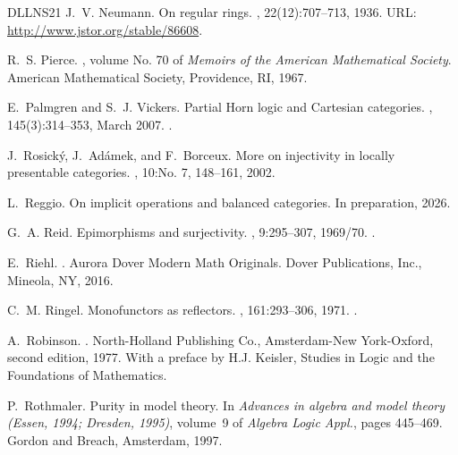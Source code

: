 \documentclass[a4paper,10pt,reqno]{amsart}
\theoremstyle{definition}
\theoremstyle{remark}
\begin{document}
\begin{thebibliography}{DLLNS21}
  J.~V. Neumann.
  \newblock On regular rings.
  , 22(12):707--713, 1936.
  \newblock URL: \url{http://www.jstor.org/stable/86608}.
  
  R.~S. Pierce.
  , volume No. 70 of {\em Memoirs of the American Mathematical Society}.
  \newblock American Mathematical Society, Providence, RI, 1967.
  
  E.~Palmgren and S.~J. Vickers.
  \newblock Partial {Horn} logic and {Cartesian} categories.
  , 145(3):314--353, March 2007.
  \newblock \href {https://doi.org/10.1016/j.apal.2006.10.001} {}.
  
  J.~Rosick\'y, J.~Ad\'amek, and F.~Borceux.
  \newblock More on injectivity in locally presentable categories.
  , 10:No. 7, 148--161, 2002.
  
  L.~Reggio.
  \newblock On implicit operations and balanced categories.
  \newblock In preparation, 2026.
  
  G.~A. Reid.
  \newblock Epimorphisms and surjectivity.
  , 9:295--307, 1969/70.
  \newblock \href {https://doi.org/10.1007/BF01425484} {}.
  
  E.~Riehl.
  .
  \newblock Aurora Dover Modern Math Originals. Dover Publications, Inc., Mineola, NY, 2016.
  
  C.~M. Ringel.
  \newblock Monofunctors as reflectors.
  , 161:293--306, 1971.
  \newblock \href {https://doi.org/10.2307/1995944} {}.
  
  A.~Robinson.
  .
  \newblock North-Holland Publishing Co., Amsterdam-New York-Oxford, second edition, 1977.
  \newblock With a preface by H.J. Keisler, Studies in Logic and the Foundations of Mathematics.
  
  P.~Rothmaler.
  \newblock Purity in model theory.
  \newblock In {\em Advances in algebra and model theory ({E}ssen, 1994; {D}resden, 1995)}, volume~9 of {\em Algebra Logic Appl.}, pages 445--469. Gordon and Breach, Amsterdam, 1997.
  

\end{thebibliography}
\end{document}
